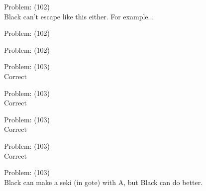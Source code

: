 \documentclass[11pt]{article}
\begin{document}
\begin{minipage}[t]{0.5\textwidth}
  {\centering
  
Problem: (102)\\
Black can't escape like this either. For example...\\
  }
\end{minipage}
\begin{minipage}[t]{0.5\textwidth}
  {\centering
  
Problem: (102)\\
  }
\end{minipage}
\begin{minipage}[t]{0.5\textwidth}
  {\centering
  
Problem: (102)\\
  }
\end{minipage}
\begin{minipage}[t]{0.5\textwidth}
  {\centering
  
Problem: (103)\\
Correct\\
  }
\end{minipage}
\begin{minipage}[t]{0.5\textwidth}
  {\centering
  
Problem: (103)\\
Correct\\
  }
\end{minipage}
\begin{minipage}[t]{0.5\textwidth}
  {\centering
  
Problem: (103)\\
Correct\\
  }
\end{minipage}
\begin{minipage}[t]{0.5\textwidth}
  {\centering
  
Problem: (103)\\
Correct\\
  }
\end{minipage}
\begin{minipage}[t]{0.5\textwidth}
  {\centering
  
Problem: (103)\\
Black can make a seki (in gote) with A, but Black can do better.\\
  }
\end{minipage}
\end{document}
